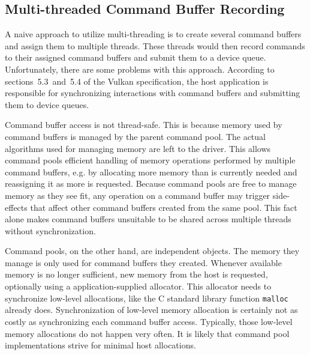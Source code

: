     \subsection{Multi-threaded Command Buffer Recording}
      A naive approach to utilize multi-threading is to create several command buffers and assign them to multiple threads.
      These threads would then record commands to their assigned command buffers and submit them to a device queue.
      Unfortunately, there are some problems with this approach.
      According to sections~5.3~and~5.4 of the Vulkan specification\cite{vkspec}, the host application is responsible for synchronizing interactions with command buffers and submitting them to device queues.

      Command buffer access is not thread-safe.
      This is because memory used by command buffers is managed by the parent command pool.
      The actual algorithms used for managing memory are left to the \gls{driver}.
      This allows command pools efficient handling of memory operations performed by multiple command buffers, e.g. by allocating more memory than is currently needed and reassigning it as more is requested.
      Because command pools are free to manage memory as they see fit, any operation on a command buffer may trigger side-effects that affect other command buffers created from the same pool.
      This fact alone makes command buffers unsuitable to be shared across multiple threads without synchronization.

      Command pools, on the other hand, are independent objects.
      The memory they manage is only used for command buffers they created.
      Whenever available memory is no longer sufficient, new memory from the host is requested, optionally using a application-supplied allocator.
      This allocator needs to synchronize low-level allocations, like the C standard library function \lstinline{malloc} already does.
      Synchronization of low-level memory allocation is certainly not as costly as synchronizing each command buffer access.
      Typically, those low-level memory allocations do not happen very often.
      It is likely that command pool implementations strive for minimal host allocations.

